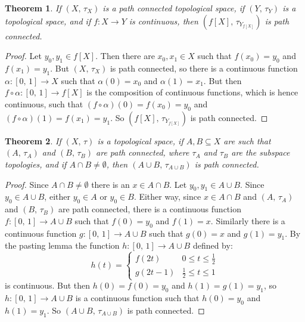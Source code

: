 \documentclass{article}
\theoremstyle{plain}
\newtheorem{theorem}{Theorem}[section]
\theoremstyle{normal}
\begin{document}
        \begin{theorem}
            If $(X,\,\tau_{X})$ is a path connected topological space,
            if $(Y,\,\tau_{Y})$ is a topological space, and if
            $f:X\rightarrow{Y}$ is continuous, then
            $(f[X],\,\tau_{Y_{f[X]}})$ is path connected.
        \end{theorem}
        \begin{proof}
            Let $y_{0},y_{1}\in{f}[X]$. Then there are
            $x_{0},x_{1}\in{X}$ such that $f(x_{0})=y_{0}$ and $f(x_{1})=y_{1}$.
            But $(X,\,\tau_{X})$ is path connected, so there is a continuous
            function $\alpha:[0,\,1]\rightarrow{X}$ such that
            $\alpha(0)=x_{0}$ and $\alpha(1)=x_{1}$. But then
            $f\circ\alpha:[0,\,1]\rightarrow{f}[X]$ is the composition of
            continuous functions, which is hence continuous, such that
            $(f\circ\alpha)(0)=f(x_{0})=y_{0}$ and
            $(f\circ\alpha)(1)=f(x_{1})=y_{1}$. So $(f[X],\,\tau_{Y_{f[X]}})$
            is path connected.
        \end{proof}
        \begin{theorem}
            If $(X,\,\tau)$ is a topological space, if
            $A,B\subseteq{X}$ are such that $(A,\,\tau_{A})$ and
            $(B,\,\tau_{B})$ are path connected, where $\tau_{A}$ and
            $\tau_{B}$ are the subspace topologies, and if
            $A\cap{B}\ne\emptyset$, then $(A\cup{B},\,\tau_{A\cup{B}})$ is
            path connected.
        \end{theorem}
        \begin{proof}
            Since $A\cap{B}\ne\emptyset$ there is an $x\in{A}\cap{B}$.
            Let $y_{0},y_{1}\in{A}\cup{B}$. Since $y_{0}\in{A}\cup{B}$, either
            $y_{0}\in{A}$ or $y_{0}\in{B}$. Either way, since $x\in{A}\cap{B}$
            and $(A,\,\tau_{A})$ and $(B,\,\tau_{B})$ are path connected,
            there is a continuous function $f:[0,\,1]\rightarrow{A}\cup{B}$
            such that $f(0)=y_{0}$ and $f(1)=x$. Similarly there is a
            continuous function $g:[0,\,1]\rightarrow{A}\cup{B}$ such that
            $g(0)=x$ and $g(1)=y_{1}$. By the pasting lemma the function
            $h:[0,\,1]\rightarrow{A}\cup{B}$ defined by:
            \begin{equation}
                h(t)=
                \begin{cases}
                    f(2t)&0\leq{t}\leq\frac{1}{2}\\
                    g(2t-1)&\frac{1}{2}\leq{t}\leq{1}
                \end{cases}
            \end{equation}
            is continuous. But then $h(0)=f(0)=y_{0}$ and $h(1)=g(1)=y_{1}$, so
            $h:[0,\,1]\rightarrow{A}\cup{B}$ is a continuous function such that
            $h(0)=y_{0}$ and $h(1)=y_{1}$. So
            $(A\cup{B},\,\tau_{A\cup{B}})$ is path connected. 
        \end{proof}
\end{document}
